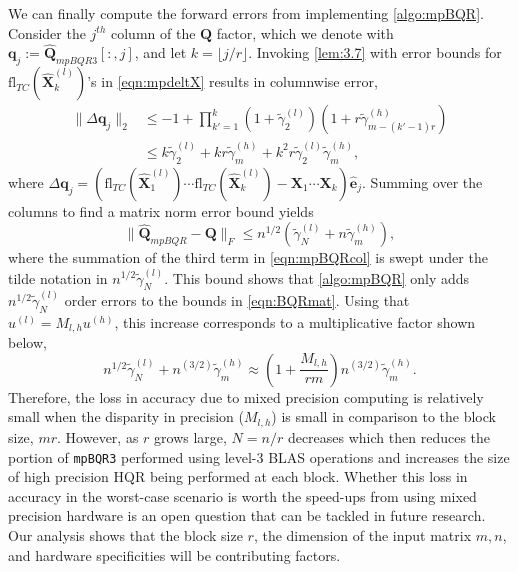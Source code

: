 \documentclass[review,onefignum,onetabnum]{siamart190516}
\newcommand{\bb}[1]{\mathbf{#1}}
\newcommand{\fl}{\mathrm{fl}}
\begin{document}
We can finally compute the forward errors from implementing \cref{algo:mpBQR}.
Consider the $j^{th}$ column of the $\bb{Q}$ factor, which we denote with $\bb{q}_j:=\hat{\bb{Q}}_{mpBQR3}[:,j]$, and let $k = \lfloor j/r\rfloor$.
Invoking \cref{lem:3.7} with error bounds for $\fl_{TC}(\hat{\bb{X}}_k^{(l)})$'s in \cref{eqn:mpdeltX} results in columnwise error,
\begin{align}
\|\Delta \bb{q}_j \|_2 &\leq -1 + \prod_{k'=1}^k (1+\tilde{\gamma}_2^{(l)})(1+r\tilde{\gamma}_{m-(k'-1)r}^{(h)})\\ 
&\leq k\tilde{\gamma}_{2}^{(l)} + kr\tilde{\gamma}_m^{(h)} + k^2r\tilde{\gamma}_{2}^{(l)}\tilde{\gamma}_m^{(h)}, \label{eqn:mpBQRcol}
\end{align} 
where $\Delta \bb{q}_j = (\fl_{TC}(\hat{\bb{X}}_1^{(l)})\cdots\fl_{TC}(\hat{\bb{X}}_k^{(l)}) - \bb{X}_1\cdots\bb{X}_k )\hat{\bb{e}}_j.$
Summing over the columns to find a matrix norm error bound yields
\begin{equation}
\|\hat{\bb{Q}}_{mpBQR}-\bb{Q}\|_F \leq n^{1/2}\left(\tilde{\gamma}_{N}^{(l)} + n\tilde{\gamma}_m^{(h)}\right),
\end{equation}
where the summation of the third term in \cref{eqn:mpBQRcol} is swept under the tilde notation in $n^{1/2} \tilde{\gamma}_{N}^{(l)}$.
This bound shows that \cref{algo:mpBQR} only adds $n^{1/2}\tilde{\gamma}_{N}^{(l)}$ order errors to the bounds in \cref{eqn:BQRmat}.
Using that $u^{(l)}=M_{l,h}u^{(h)}$, this increase corresponds to a multiplicative factor shown below,
\begin{equation}
n^{1/2}\tilde{\gamma}_{N}^{(l)} + n^{(3/2)}\tilde{\gamma}_m^{(h)} \approx \left(1+\frac{M_{l,h}}{rm}\right)n^{(3/2)}\tilde{\gamma}_m^{(h)}. \label{eqn:mpBQR3}
\end{equation}
Therefore, the loss in accuracy due to mixed precision computing is relatively small when the disparity in precision ($M_{l,h}$) is small in comparison to the block size, $mr$.
However, as $r$ grows large, $N=n/r$ decreases which then reduces the portion of {\tt mpBQR3} performed using level-3 BLAS operations and increases the size of high precision HQR being performed at each block.
Whether this loss in accuracy in the worst-case scenario is worth the speed-ups from using mixed precision hardware is an open question that can be tackled in future research.
Our analysis shows that the block size $r$, the dimension of the input matrix $m,n$, and hardware specificities will be contributing factors. 
\end{document}
